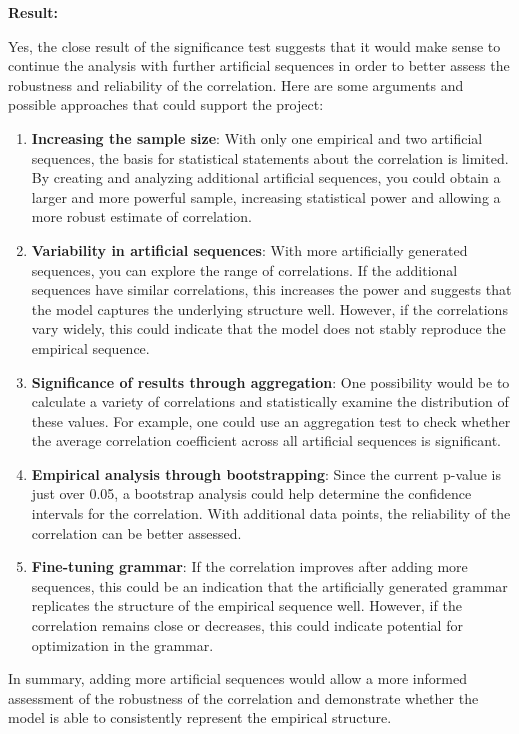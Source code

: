 \documentclass[
]{article}
\begin{document}
\textbf{Result:}

Yes, the close result of the significance test suggests that it would
make sense to continue the analysis with further artificial sequences in
order to better assess the robustness and reliability of the
correlation. Here are some arguments and possible approaches that could
support the project:

\begin{enumerate}
\def\labelenumi{\arabic{enumi}.}
\item
  \textbf{Increasing the sample size}: With only one empirical and two
  artificial sequences, the basis for statistical statements about the
  correlation is limited. By creating and analyzing additional
  artificial sequences, you could obtain a larger and more powerful
  sample, increasing statistical power and allowing a more robust
  estimate of correlation.
\item
  \textbf{Variability in artificial sequences}: With more artificially
  generated sequences, you can explore the range of correlations. If the
  additional sequences have similar correlations, this increases the
  power and suggests that the model captures the underlying structure
  well. However, if the correlations vary widely, this could indicate
  that the model does not stably reproduce the empirical sequence.
\item
  \textbf{Significance of results through aggregation}: One possibility
  would be to calculate a variety of correlations and statistically
  examine the distribution of these values. For example, one could use
  an aggregation test to check whether the average correlation
  coefficient across all artificial sequences is significant.
\item
  \textbf{Empirical analysis through bootstrapping}: Since the current
  p-value is just over 0.05, a bootstrap analysis could help determine
  the confidence intervals for the correlation. With additional data
  points, the reliability of the correlation can be better assessed.
\item
  \textbf{Fine-tuning grammar}: If the correlation improves after adding
  more sequences, this could be an indication that the artificially
  generated grammar replicates the structure of the empirical sequence
  well. However, if the correlation remains close or decreases, this
  could indicate potential for optimization in the grammar.
\end{enumerate}

In summary, adding more artificial sequences would allow a more informed
assessment of the robustness of the correlation and demonstrate whether
the model is able to consistently represent the empirical structure.
\end{document}
